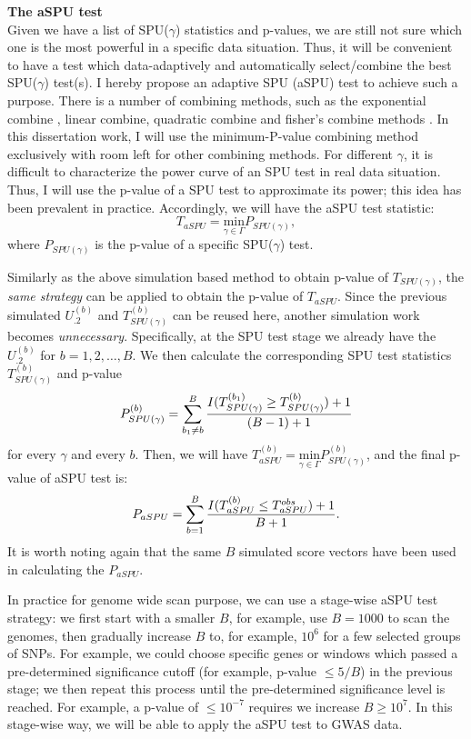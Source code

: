 \documentclass[12pt]{article}
\begin{document}
\textbf{The aSPU test}\\
Given we have a list of SPU($\gamma$) statistics and p-values, we are still not sure which one is the most powerful in a specific data situation. Thus, it will be convenient to have a test which data-adaptively and automatically select/combine the best SPU($\gamma$) test(s). I hereby propose an adaptive SPU (aSPU) test to achieve such a purpose. There is a number of combining methods, such as the exponential combine \cite{Chen2012}, linear combine, quadratic combine and fisher's combine methods \cite{Luo2010,peng2009gene,Derkach2013}. In this dissertation work, I will use the minimum-P-value combining method exclusively with room left for other combining methods. For different $\gamma$, it is difficult to characterize the power curve of an SPU test in real data situation. Thus, I will use the p-value of a SPU test to approximate its power; this idea has been prevalent in practice. Accordingly, we will have the aSPU test statistic:
$$
T_{aSPU} = \underset{\gamma\in\Gamma}{ \textrm{min} } P_{ SPU(\gamma) },
$$
where $P_{ SPU(\gamma) }$ is the p-value of a specific SPU($\gamma$) test.

Similarly as the above simulation based method to obtain p-value of $T_{ SPU(\gamma) }$, the \textit{same strategy} can be applied to obtain the p-value of $T_{aSPU}$. Since the previous simulated $U_{.2}^{ (b) }$ and $T^{ (b) }_{ SPU(\gamma) }$ can be reused here, another simulation work becomes \textit{unnecessary}. Specifically, at the SPU test stage we already have the $U_{.2}^{ (b) }$ for $b = 1,2,\ldots,B$. We then calculate the corresponding SPU test statistics $T^{ (b) }_{ SPU(\gamma) }$ and p-value 
$$
P^{ (b) }_{ SPU(\gamma) } =  \sum_{b_1 \neq b}^B { I(T^{ (b_1) }_{ SPU(\gamma) } \geq T^{ (b) }_{ SPU(\gamma) } ) + 1  \over (B-1) + 1 } 
$$
for every $\gamma$ and every $b$. Then, we will have $ 
T ^ {(b)} _{aSPU} = \underset{\gamma\in\Gamma}{ \textrm{min} } P^{ (b) }_{ SPU(\gamma) }
$, and the final p-value of aSPU test is:
$$
P_{aSPU} = \sum_{b=1}^B { I(T ^ {(b)} _{aSPU} \leq T ^ {obs} _{aSPU} ) + 1  \over B + 1 }.
$$
It is worth noting again that the same $B$ simulated score vectors have been used in calculating the $P_{aSPU}$. 

In practice for genome wide scan purpose, we can use a stage-wise aSPU test strategy: we first start with a smaller $B$, for example, use $B = 1000$ to scan the genomes, then gradually increase $B$ to, for example, $10^6$ for a few selected groups of SNPs. For example, we could choose specific genes or windows which passed a pre-determined significance cutoff (for example, p-value $ \leq 5/B$) in the previous stage; we then repeat this process until the pre-determined significance level is reached. For example, a p-value of $\leq 10 ^ {-7}$ requires we increase $B \geq 10^7$. In this stage-wise way, we will be able to apply the aSPU test to GWAS data. 
\end{document}

